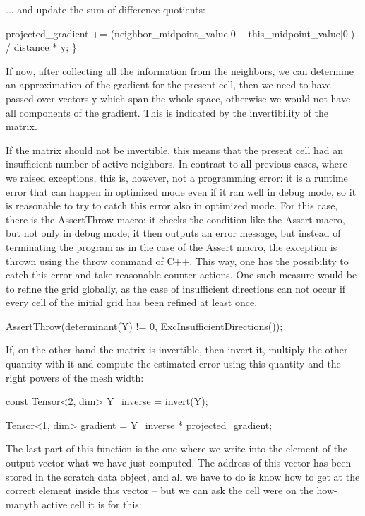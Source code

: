 ... and update the sum of difference quotients\+:


\begin{DoxyCode}
    projected\_gradient +=
        (neighbor\_midpoint\_value[0] - this\_midpoint\_value[0]) / distance *
        y;
\}
\end{DoxyCode}


If now, after collecting all the information from the neighbors, we can determine an approximation of the gradient for the present cell, then we need to have passed over vectors {\ttfamily y} which span the whole space, otherwise we would not have all components of the gradient. This is indicated by the invertibility of the matrix.

If the matrix should not be invertible, this means that the present cell had an insufficient number of active neighbors. In contrast to all previous cases, where we raised exceptions, this is, however, not a programming error\+: it is a runtime error that can happen in optimized mode even if it ran well in debug mode, so it is reasonable to try to catch this error also in optimized mode. For this case, there is the {\ttfamily Assert\+Throw} macro\+: it checks the condition like the {\ttfamily Assert} macro, but not only in debug mode; it then outputs an error message, but instead of terminating the program as in the case of the {\ttfamily Assert} macro, the exception is thrown using the {\ttfamily throw} command of C++. This way, one has the possibility to catch this error and take reasonable counter actions. One such measure would be to refine the grid globally, as the case of insufficient directions can not occur if every cell of the initial grid has been refined at least once.


\begin{DoxyCode}
AssertThrow(determinant(Y) != 0, ExcInsufficientDirections());
\end{DoxyCode}


If, on the other hand the matrix is invertible, then invert it, multiply the other quantity with it and compute the estimated error using this quantity and the right powers of the mesh width\+:


\begin{DoxyCode}
\textcolor{keyword}{const} Tensor<2, dim> Y\_inverse = invert(Y);

Tensor<1, dim> gradient = Y\_inverse * projected\_gradient;
\end{DoxyCode}


The last part of this function is the one where we write into the element of the output vector what we have just computed. The address of this vector has been stored in the scratch data object, and all we have to do is know how to get at the correct element inside this vector -- but we can ask the cell we\textquotesingle{}re on the how-\/manyth active cell it is for this\+:


